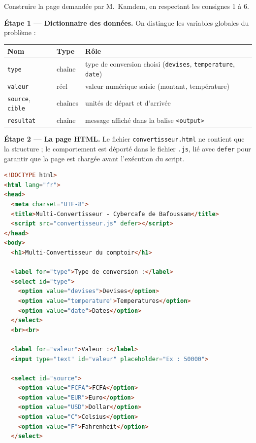\documentclass[11pt]{article}
\begin{document}
\begin{exoresolu}
Construire la page demandée par M.~Kamdem, en respectant les consignes 1 à 6.

\tcblower

\textbf{Étape 1 — Dictionnaire des données.} On distingue les variables globales du problème :

\begin{center}
\begin{tabularx}{\linewidth}{|l|l|X|}
\hline
\rowcolor{popblueL} \textbf{Nom} & \textbf{Type} & \textbf{Rôle} \\
\hline
\texttt{type} & chaîne & type de conversion choisi (\texttt{devises}, \texttt{temperature}, \texttt{date}) \\
\hline
\texttt{valeur} & réel & valeur numérique saisie (montant, température) \\
\hline
\texttt{source}, \texttt{cible} & chaînes & unités de départ et d'arrivée \\
\hline
\texttt{resultat} & chaîne & message affiché dans la balise \texttt{<output>} \\
\hline
\end{tabularx}
\end{center}

\textbf{Étape 2 — La page HTML.} Le fichier \texttt{convertisseur.html} ne contient que la structure ; le comportement est déporté dans le fichier \texttt{.js}, lié avec \texttt{defer} pour garantir que la page est chargée avant l'exécution du script.

\begin{lstlisting}[language=HTML]
<!DOCTYPE html>
<html lang="fr">
<head>
  <meta charset="UTF-8">
  <title>Multi-Convertisseur - Cybercafe de Bafoussam</title>
  <script src="convertisseur.js" defer></script>
</head>
<body>
  <h1>Multi-Convertisseur du comptoir</h1>

  <label for="type">Type de conversion :</label>
  <select id="type">
    <option value="devises">Devises</option>
    <option value="temperature">Temperatures</option>
    <option value="date">Dates</option>
  </select>
  <br><br>

  <label for="valeur">Valeur :</label>
  <input type="text" id="valeur" placeholder="Ex : 50000">

  <select id="source">
    <option value="FCFA">FCFA</option>
    <option value="EUR">Euro</option>
    <option value="USD">Dollar</option>
    <option value="C">Celsius</option>
    <option value="F">Fahrenheit</option>
  </select>


\end{lstlisting}
\end{exoresolu}
\end{document}
